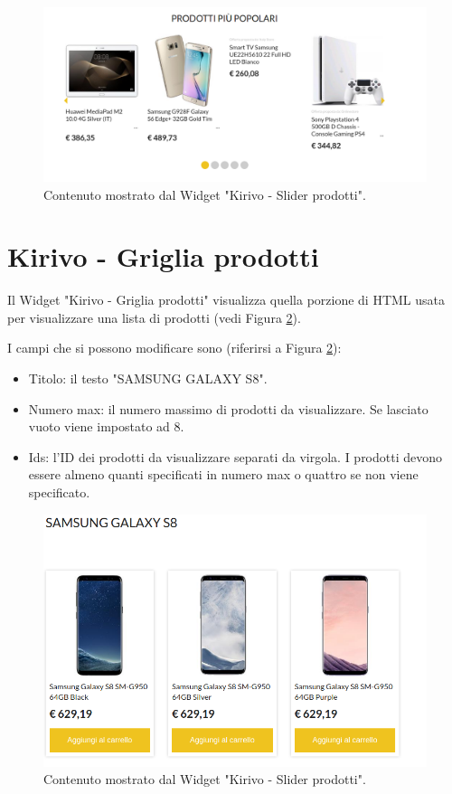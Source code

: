 \begin{figure}
  \includegraphics[width=\textwidth]{figure/kslide.png}
  \caption{Contenuto mostrato dal Widget "Kirivo - Slider prodotti".}
  \label{fig:kslide}
\end{figure}



\newpage
\section{Kirivo - Griglia prodotti}
Il Widget "Kirivo - Griglia prodotti"   visualizza quella porzione di HTML usata
per visualizzare una lista di prodotti (vedi Figura \ref{fig:wrenderk}).

I campi che si possono modificare sono (riferirsi a Figura \ref{fig:wrenderk}):
\begin{itemize}
\item Titolo: il testo "SAMSUNG GALAXY S8".
\item Numero max: il numero massimo di prodotti da visualizzare. Se lasciato vuoto viene impostato ad 8.
\item Ids: l'ID dei prodotti da visualizzare separati da virgola. I prodotti devono
essere almeno quanti specificati in numero max o quattro se non viene specificato.
\end{itemize}


\begin{figure}
  \includegraphics[width=\textwidth]{figure/sms-render.png}
  \caption{Contenuto mostrato dal Widget "Kirivo - Slider prodotti".}
  \label{fig:wrenderk}
\end{figure}